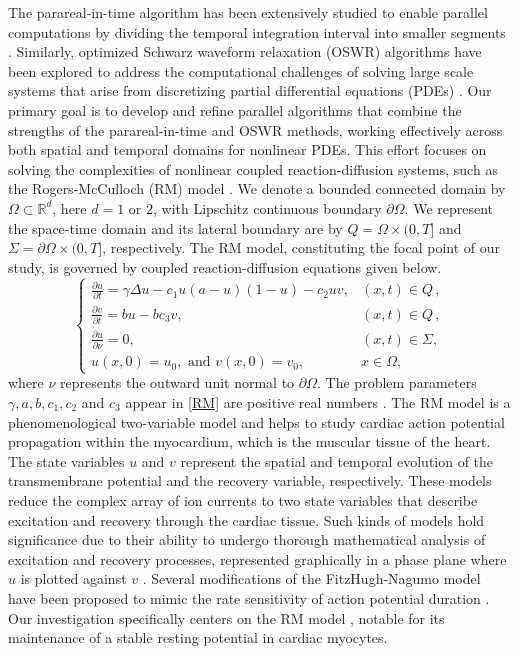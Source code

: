 \documentclass[11pt]{article}
\newcommand{\Real}{\mathbb R}
\begin{document}
The parareal-in-time algorithm has been extensively studied to enable parallel computations by dividing the temporal integration interval into smaller segments \cite{lions2001parareal}. Similarly, optimized Schwarz waveform relaxation (OSWR) algorithms have been explored to address the computational challenges of solving large scale systems that arise from discretizing partial differential equations (PDEs) \cite{gander2007optimized}.
Our primary goal is to develop and refine parallel algorithms that combine the strengths of the parareal-in-time and OSWR methods, working effectively across both spatial and temporal domains for nonlinear PDEs. This effort focuses on solving the complexities of nonlinear coupled reaction-diffusion systems, such as the Rogers-McCulloch (RM) model \cite{rogers1994collocation}.
We denote a bounded connected domain by $\Omega \subset \Real^{d}$, here $d=1 \textrm{ or } 2$, with Lipschitz continuous boundary $\partial \Omega$. We represent the space-time domain and its lateral
boundary are by $Q = \Omega \times (0,T]$ and $\Sigma = \partial \Omega \times (0,T]$, respectively.
The RM model, constituting the focal point of our study, is governed by coupled reaction-diffusion equations given below.
\begin{equation}\label{RM}
\begin{cases}
\frac{\partial u}{\partial t}  = \gamma \Delta u - c_1u(a-u)(1-u) - c_2uv, & (x, t)\in Q\,,\\
\frac{\partial v}{\partial t} = bu - bc_3v , & (x, t)\in Q\,,\\
\frac{\partial u}{\partial \nu}=0, & (x, t)\in \Sigma,\\
u(x,0)=u_0, \text{ and } v(x,0)=v_0, & x\in \Omega,
\end{cases}
\end{equation}
where $\nu$ represents the outward unit normal to $\partial\Omega$. The problem parameters $\gamma, a, b, c_1, c_2$ and $c_3$ appear in \eqref{RM} are positive real numbers \cite{rogers1994collocation}.
The RM model is a phenomenological two-variable model and helps to study cardiac action potential propagation within the myocardium, which is the muscular tissue of the heart. The state variables $u$ and $v$ represent the spatial and temporal evolution of the transmembrane potential and the recovery variable, respectively. These models reduce the complex array of ion currents to two state variables that describe excitation and recovery through the cardiac tissue. 
Such kinds of models hold significance due to their ability to undergo thorough mathematical analysis of excitation and recovery processes, represented graphically in a phase plane where $u$ is plotted against $v$ \cite{keener2009mathematical}. Several modifications of the FitzHugh-Nagumo model have been proposed to mimic the rate sensitivity of action potential duration \cite{Aliev96, vanCapelle_CircRes80, rogers1994collocation, Mitchell_BMB03}. Our investigation specifically centers on the RM model \cite{rogers1994collocation}, notable for its maintenance of a stable resting potential in cardiac myocytes.
\end{document}
